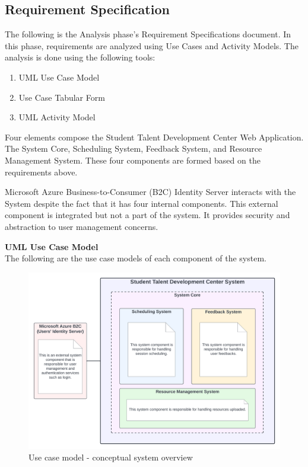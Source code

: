 \subsection{Requirement Specification}
\begin{justify}
The following is the Analysis phase's Requirement Specifications document. In this phase, requirements are analyzed using Use Cases and Activity Models. The analysis is done using the following tools:
\begin{enumerate}
    \item UML Use Case Model
    \item Use Case Tabular Form
    \item UML Activity Model
\end{enumerate}

\noindent Four elements compose the Student Talent Development Center Web Application. The System Core, Scheduling System, Feedback System, and Resource Management System. These four components are formed based on the requirements above.

\newendline Microsoft Azure Business-to-Consumer (B2C) Identity Server interacts with the System despite the fact that it has four internal components. This external component is integrated but not a part of the system. It provides security and abstraction to user management concerns.

\clearpage
\vspace{0.25cm}
\newendline\textbf{UML Use Case Model}\\
The following are the use case models of each component of the system.

\begin{figure}[H]
    \centerline{\includegraphics[width=150mm,scale=1]{figures/analysis_and_design/analysis/1. Conceptual System Overview.png}}
    \caption{Use case model - conceptual system overview}
    \label{ConceptualSystemOverview}
\end{figure}


\end{justify}
